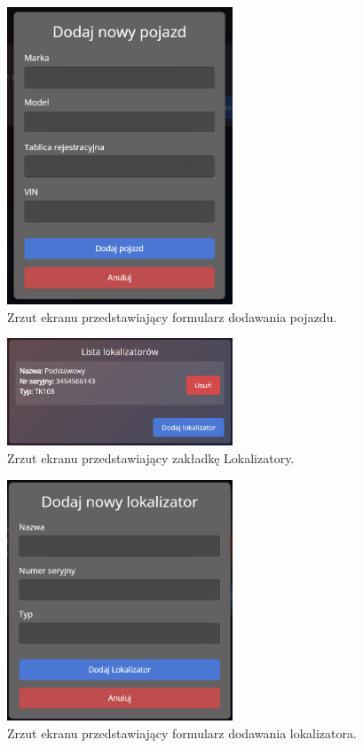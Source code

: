 \begin{figure}
	\centering
	\includegraphics[width=0.6\textwidth]{./graf/add_vehicle.png}
	\caption{Zrzut ekranu przedstawiający formularz dodawania pojazdu.}
	\label{fig:4.9}
\end{figure}

\begin{figure}
	\centering
	\includegraphics[width=0.6\textwidth]{./graf/tracker_tab.png}
	\caption{Zrzut ekranu przedstawiający zakładkę Lokalizatory.}
	\label{fig:4.10}
\end{figure}

\begin{figure}
	\centering
	\includegraphics[width=0.6\textwidth]{./graf/add_tracker.png}
	\caption{Zrzut ekranu przedstawiający formularz dodawania lokalizatora.}
	\label{fig:4.11}
\end{figure}

